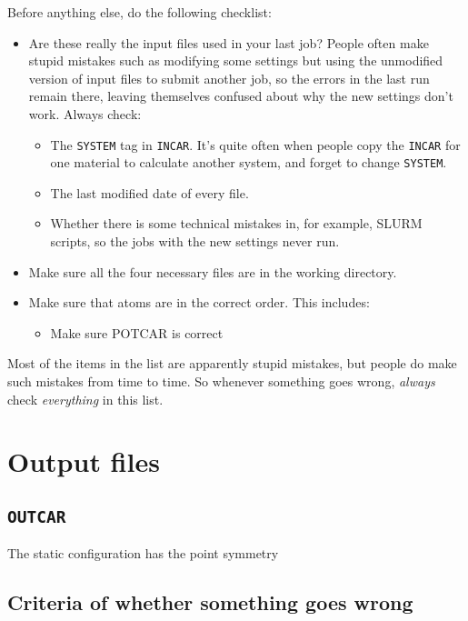\documentclass[hyperref, a4paper]{article}
\begin{document}
Before anything else, do the following checklist:
\begin{itemize}
    \item Are these really the input files used in your last job?
    People often make stupid mistakes such as modifying some settings but using the unmodified version of input files to submit another job, so the errors in the last run remain there, leaving themselves confused about why the new settings don't work.
    Always check:
    \begin{itemize}
        \item The \texttt{SYSTEM} tag in \texttt{INCAR}. It's quite often when people copy the \texttt{INCAR} for one material to calculate another system, and forget to change \texttt{SYSTEM}.
        \item The last modified date of every file.
        \item Whether there is some technical mistakes in, for example, SLURM scripts, so the jobs with the new settings never run.
    \end{itemize} 
    \item Make sure all the four necessary files are in the working directory. 
    \item Make sure that atoms are in the correct order. This includes:
    \begin{itemize}
        \item Make sure POTCAR is correct
    \end{itemize}
\end{itemize}
Most of the items in the list are apparently stupid mistakes, but people do make such mistakes from time to time.
So whenever something goes wrong, \emph{always} check \emph{everything} in this list.

\section{Output files}

\subsection{\texttt{OUTCAR}}

The static configuration has the point symmetry

\subsection{Criteria of whether something goes wrong}\label{sec:outfile-bugs}
\end{document}
